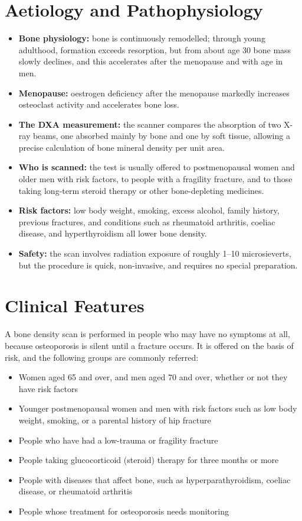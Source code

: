 \section*{Aetiology and Pathophysiology}
\begin{itemize}
    \item \textbf{Bone physiology:} bone is continuously remodelled; through young adulthood, formation exceeds resorption, but from about age 30 bone mass slowly declines, and this accelerates after the menopause and with age in men.
    \item \textbf{Menopause:} oestrogen deficiency after the menopause markedly increases osteoclast activity and accelerates bone loss.
    \item \textbf{The DXA measurement:} the scanner compares the absorption of two X-ray beams, one absorbed mainly by bone and one by soft tissue, allowing a precise calculation of bone mineral density per unit area.
    \item \textbf{Who is scanned:} the test is usually offered to postmenopausal women and older men with risk factors, to people with a fragility fracture, and to those taking long-term steroid therapy or other bone-depleting medicines.
    \item \textbf{Risk factors:} low body weight, smoking, excess alcohol, family history, previous fractures, and conditions such as rheumatoid arthritis, coeliac disease, and hyperthyroidism all lower bone density.
    \item \textbf{Safety:} the scan involves radiation exposure of roughly 1--10 microsieverts, but the procedure is quick, non-invasive, and requires no special preparation.
\end{itemize}

\section*{Clinical Features}
A bone density scan is performed in people who may have no symptoms at all, because osteoporosis is silent until a fracture occurs. It is offered on the basis of risk, and the following groups are commonly referred:
\begin{itemize}
    \item Women aged 65 and over, and men aged 70 and over, whether or not they have risk factors
    \item Younger postmenopausal women and men with risk factors such as low body weight, smoking, or a parental history of hip fracture
    \item People who have had a low-trauma or fragility fracture
    \item People taking glucocorticoid (steroid) therapy for three months or more
    \item People with diseases that affect bone, such as hyperparathyroidism, coeliac disease, or rheumatoid arthritis
    \item People whose treatment for osteoporosis needs monitoring
\end{itemize}

